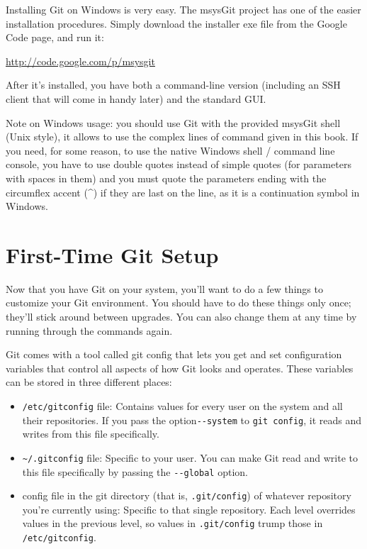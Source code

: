 \documentclass[a4paper]{book}
\begin{document}
Installing Git on Windows is very easy. The msysGit project has one of the easier installation procedures. Simply download the installer exe file from the Google Code page, and run it:

\url{http://code.google.com/p/msysgit}

After it's installed, you have both a command-line version (including an SSH client that will come in handy later) and the standard GUI.

Note on Windows usage: you should use Git with the provided msysGit shell (Unix style), it allows to use the complex lines of command given in this book. If you need, for some reason, to use the native Windows shell / command line console, you have to use double quotes instead of simple quotes (for parameters with spaces in them) and you must quote the parameters ending with the circumflex accent (\^{}) if they are last on the line, as it is a continuation symbol in Windows.

\section{First-Time Git Setup}

Now that you have Git on your system, you'll want to do a few things to customize your Git environment. You should have to do these things only once; they'll stick around between upgrades. You can also change them at any time by running through the commands again.

Git comes with a tool called git config that lets you get and set configuration variables that control all aspects of how Git looks and operates. These variables can be stored in three different places:

\begin{itemize}
\itemsep1pt\parskip0pt
\item
  \texttt{/etc/gitconfig} file: Contains values for every user on the system and all their repositories. If you pass the option\texttt{-{}-system} to \texttt{git config}, it reads and writes from this file specifically.
\item
  \texttt{\textasciitilde{}/.gitconfig} file: Specific to your user. You can make Git read and write to this file specifically by passing the \texttt{-{}-global} option.
\item
  config file in the git directory (that is, \texttt{.git/config}) of whatever repository you're currently using: Specific to that single repository. Each level overrides values in the previous level, so values in \texttt{.git/config} trump those in \texttt{/etc/gitconfig}.
\end{itemize}
\end{document}
